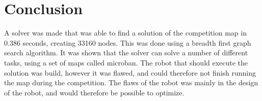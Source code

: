 \section{Conclusion}
A solver was made that was able to find a solution of the competition map in 0.386 seconds, creating 33160 nodes.
This was done using a breadth first graph search algorithm. 
It was shown that the solver can solve a number of different tasks, using a set of maps called microban. 
The robot that should execute the solution was build, however it was flawed, and could therefore not finish running the map during the competition.
The flaws of the robot was mainly in the design of the robot, and would therefore be possible to optimize. 